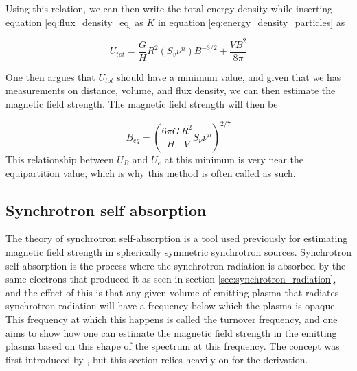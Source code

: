 Using this relation, we can then write the total energy density while inserting equation \ref{eq:flux_density_eq} as $K$ in equation \ref{eq:energy_density_particles} as

\begin{equation}
    U_{tot} = \frac{G}{H}R^2(S_v\nu^n)B^{-3/2} + \frac{V B^2}{8\pi}
\end{equation}

One then argues that $U_{tot}$ should have a minimum value, and given that we has measurements on distance, volume, and flux density, we can then estimate the magnetic field strength. The magnetic field strength will then be

\begin{equation}
    B_{eq} = \left(\frac{6\pi G}{H}\frac{R^2}{V}S_\nu \nu^n\right)^{2/7}
\end{equation}
This relationship between $U_B$ and $U_e$ at this minimum is very near the equipartition value, which is why this method is often called as such.


\subsection{Synchrotron self absorption}
\label{sec:SSA}

The theory of synchrotron self-absorption is a tool used previously for estimating magnetic field strength in spherically symmetric synchrotron sources. Synchrotron self-absorption is the process where the synchrotron radiation is absorbed by the same electrons that produced it as seen in section \ref{sec:synchrotron_radiation}, and the effect of this is that any given volume of emitting plasma that radiates synchrotron radiation will have a frequency below which the plasma is opaque. This frequency at which this happens is called the turnover frequency, and one aims to show how one can estimate the magnetic field strength in the emitting plasma based on this shape of the spectrum at this frequency. The concept was first introduced by \cite{1983ApJ...264..296M}, but this section relies heavily on \cite{Hirotani_2005} for the derivation. 


